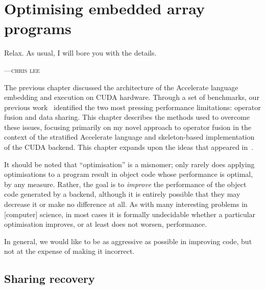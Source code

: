 
\chapter{Optimising embedded array programs}
\label{ch:optimising}

\epigraph{Relax. As usual, I will bore you with the details.}%
{\textsc{---chris lee}}

The previous chapter discussed the architecture of the Accelerate language
embedding and execution on CUDA hardware. Through a set of benchmarks, our
previous work~\cite{Chakravarty:2011fr} identified the two most pressing
performance limitations: operator fusion and data sharing. This chapter
describes the methods used to overcome these issues, focusing primarily on my
novel approach to operator fusion in the context of the stratified Accelerate
language and skeleton-based implementation of the CUDA backend. This chapter
expands upon the ideas that appeared in~\cite{McDonell:2013wi}.

It should be noted that ``optimisation'' is a misnomer; only rarely does
applying optimisations to a program result in object code whose performance is
optimal, by any measure. Rather, the goal is to \emph{improve} the performance
of the object code generated by a backend, although it is entirely possible that
they may decrease it or make no difference at all. As with many interesting
problems in [computer] science, in most cases it is formally undecidable whether
a particular optimisation improves, or at least does not worsen, performance.

In general, we would like to be as aggressive as possible in improving code, but
not at the expense of making it incorrect.


%

\section{Sharing recovery}
\label{sec:sharing_recovery}

